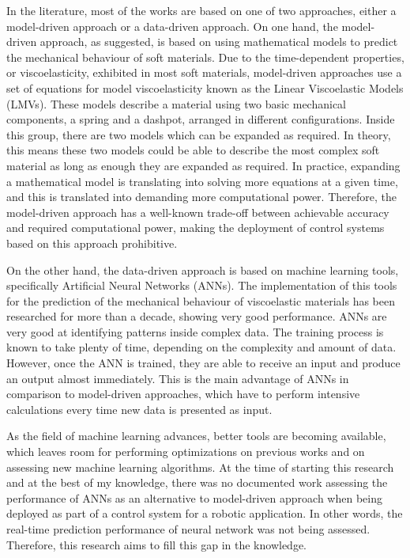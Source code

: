 In the literature, most of the works are based on one of two approaches, either a model-driven approach or a data-driven approach. On one hand, the model-driven approach, as suggested, is based on using mathematical models to predict the mechanical behaviour of soft materials. Due to the time-dependent properties, or viscoelasticity, exhibited in most soft materials, model-driven approaches use a set of equations for model viscoelasticity known as the Linear Viscoelastic Models (LMVs). These models describe a material using two basic mechanical components, a spring and a dashpot, arranged in different configurations. Inside this group, there are two models which can be expanded as required. In theory, this means these two models could be able to describe the most complex soft material as long as enough they are expanded as required. In practice, expanding a mathematical model is translating into solving more equations at a given time, and this is translated into demanding more computational power. Therefore, the model-driven approach has a well-known trade-off between achievable accuracy and required computational power, making the deployment of control systems based on this approach prohibitive. 

On the other hand, the data-driven approach is based on machine learning tools, specifically Artificial Neural Networks (ANNs). The implementation of this tools for the prediction of the mechanical behaviour of viscoelastic materials has been researched for more than a decade, showing very good performance. ANNs are very good at identifying patterns inside complex data. The training process is known to take plenty of time, depending on the complexity and amount of data. However, once the ANN is trained, they are able to receive an input and produce an output almost immediately. This is the main advantage of ANNs in comparison to model-driven approaches, which have to perform intensive calculations every time new data is presented as input.

As the field of machine learning advances, better tools are becoming available, which leaves room for performing optimizations on previous works and on assessing new machine learning algorithms. At the time of starting this research and at the best of my knowledge, there was no documented work assessing the performance of ANNs as an alternative to model-driven approach when being deployed as part of a control system for a robotic application. In other words, the real-time prediction performance of neural network was not being assessed. Therefore, this research aims to fill this gap in the knowledge.

